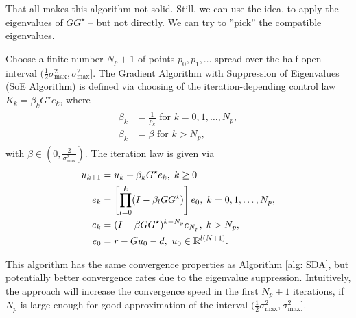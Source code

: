 That all makes this algorithm not solid. Still, we can use the idea, to apply the eigenvalues of $G G^{\star}$ -- but not directly. We can try to ''pick'' the compatible eigenvalues.
\begin{alg}
	Choose a finite number $N_p + 1$ of points $p_0, p_1, \dots$ spread over the half-open interval $(\frac{1}{2}\sigma_{\max}^2, \sigma_{\max}^2]$. 
	The Gradient Algorithm with Suppression of Eigenvalues (SoE Algorithm) is defined via choosing of the iteration-depending control law  $K_k = \beta_k G^\star e_k$, where 
	\begin{align}
	\begin{split}
	\beta_k &= \frac{1}{p_k} \text{ for } k = 0 , 1, \dots , N_p,\\
	\beta_k &= \beta  \text{ for } k > N_p,
	\end{split}
	\end{align}
	with $\beta \in (0, \frac{2}{\sigma_{\max}^2})$.
	The iteration law is given via
	\begin{align}
	\begin{split}
	u_{k+1} &= u_k + \beta_k G^\star e_k, \; k\geq 0\\
	e _{k} &= \left[\prod_{l = 0}^k (I - \beta_l  GG^\star) \right] e_{0}, \;  k = 0 , 1, \dots , N_p,\\
	e _{k} &=  (I - \beta GG^\star)^{k - N_p} e_{N_p}, \;  k > N_p, \\
	e_0 &= r -  Gu_0 -d, \text{ } u_0 \in {\mathbb{R}}^{l (N+1)}.
	\end{split}
	\end{align}	
\end{alg}

This algorithm has the same convergence properties as Algorithm \ref{alg: SDA}, but potentially better convergence rates due to the eigenvalue suppression. Intuitively, the approach will increase the convergence speed in the first $N_p + 1$ iterations, if $N_p$ is large enough for good approximation of the interval $(\frac{1}{2} \sigma_{\max}^2, \sigma_{\max}^2]$.


